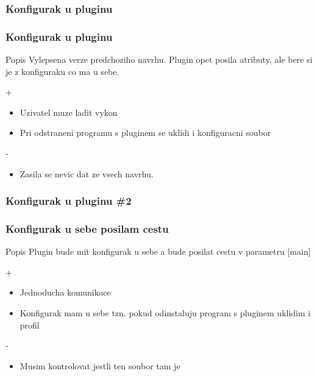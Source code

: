 \documentclass[pdf]{beamer}
\begin{document}
\subsubsection{Konfigurak u pluginu}
\begin{frame} %
	\frametitle{Konfigurak u pluginu}
	\begin{block}{Popis}
		Vylepsena verze predchoziho navrhu. Plugin opet posila atributy, ale bere si je z konfiguraku co ma u sebe.
	\end{block}
	\begin{block}{+}
		\begin{itemize}
			\item Uzivatel muze ladit vykon
			\item Pri odstraneni programu s pluginem se uklidi i konfiguracni soubor
		\end{itemize}
	\end{block}
	\begin{block}{-}
		\begin{itemize}
			\item Zasila se nevic dat ze vsech navrhu.
		\end{itemize}
	\end{block}
\end{frame} %

\subsubsection{Konfigurak u pluginu \#2}
\begin{frame} %
	\frametitle{Konfigurak u sebe posilam cestu}
	\begin{block}{Popis}
		Plugin bude mit konfigurak u sebe a bude posilat cestu v parametru [main]
	\end{block}
	\begin{block}{+}
		\begin{itemize}
			\item Jednoducha komunikace
			\item Konfigurak mam u sebe tzn. pokud odinstaluju program s pluginem uklidim i profil
		\end{itemize}
	\end{block}
	\begin{block}{-}
		\begin{itemize}
			\item Musim kontrolovat jestli ten soubor tam je
		\end{itemize}
	\end{block}
\end{frame} %
\end{document}
